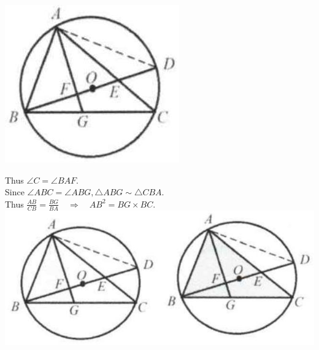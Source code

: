 \documentclass{article}
\begin{document}
\includegraphics[width=\textwidth]{images/165(2).jpg}

Thus \(\angle C=\angle B A F\).\\
Since \(\angle A B C=\angle A B G, \triangle A B G \sim \triangle C B A\).\\
Thus \(\frac{A B}{C B}=\frac{B G}{B A} \quad \Rightarrow \quad A B^{2}=B G \times B C\).\\
\centering
\includegraphics[width=\textwidth]{images/166.jpg}
\end{document}
